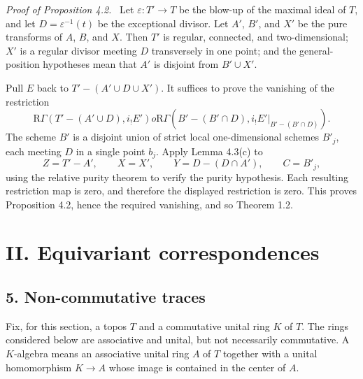 \documentclass[12pt]{article}
\newcommand{\R}{\mathrm R}
\newenvironment{prooftext}[1][Proof]{\par\noindent\emph{#1.}\ }{\par\medskip}
\begin{document}
\begin{prooftext}[Proof of Proposition 4.2]
Let $\varepsilon:T'\to T$ be the blow-up of the maximal ideal of $T$, and let $D=\varepsilon^{-1}(t)$ be the exceptional divisor. Let $A'$, $B'$, and $X'$ be the pure transforms of $A$, $B$, and $X$. Then $T'$ is regular, connected, and two-dimensional; $X'$ is a regular divisor meeting $D$ transversely in one point; and the general-position hypotheses mean that $A'$ is disjoint from $B'\cup X'$.

Pull $E$ back to $T'-(A'\cup D\cup X')$. It suffices to prove the vanishing of the restriction
\[
   \R\Gamma(T'-(A'\cup D),i_!E')	o
   \R\Gamma(B'-(B'\cap D),i_!E'|_{B'-(B'\cap D)}).
\]
The scheme $B'$ is a disjoint union of strict local one-dimensional schemes $B'_j$, each meeting $D$ in a single point $b_j$. Apply Lemma 4.3(c) to
\[
   Z=T'-A',\qquad X=X',\qquad Y=D-(D\cap A'),\qquad C=B'_j,
\]
using the relative purity theorem to verify the purity hypothesis. Each resulting restriction map is zero, and therefore the displayed restriction is zero. This proves Proposition 4.2, hence the required vanishing, and so Theorem 1.2.
\end{prooftext}


\section*{II. Equivariant correspondences}

\subsection*{5. Non-commutative traces}
Fix, for this section, a topos $T$ and a commutative unital ring $K$ of $T$. The rings considered below are associative and unital, but not necessarily commutative. A $K$-algebra means an associative unital ring $A$ of $T$ together with a unital homomorphism $K\to A$ whose image is contained in the center of $A$.
\end{document}
